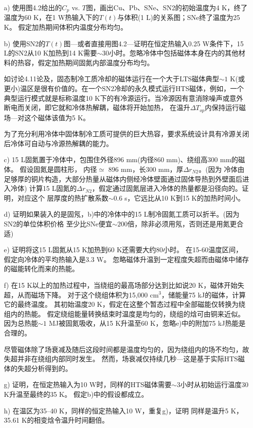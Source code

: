 a) 使用图4.2给出的$C_p$ vs. $T$图，画出Cu、Pb、SNe、SN2的初始温度为4 K，终了温度为60 K，在1 W热输入下的$T(t)$与体积(1 L)的关系图；SNe终了温度为25 K。
假定加热期间体积内温度分布均匀。

b) 使用SN2的$T(t)$图---或者直接用图4.2---证明在恒定热输入0.25 W条件下，15 L的SN2从10 K加热到14 K需要$\sim 30$小时。忽略冷体中包括磁体本身在内的其他材料的热容，假定加热期间固氮内部温度分布均匀。

如讨论4.11论及，固态制冷工质冷却的磁体运行在一个大于LTS磁体典型$\sim 1$ K(或更小)温区是很有价值的。在一个SN2冷却的永久模式运行HTS磁体，例如，一个典型运行模式就是标称温度10 K下的有冷源运行。当冷源因有意消除噪声或意外断电而关闭，即它就和冷体热解耦，磁体将开始加热，
在温升$\Delta T_{op}$内保持运行磁场---对这个磁体该值为5 K。

为了充分利用冷体中固体制冷工质可提供的巨大热容，要求系统设计具有冷源关闭后冷体可自动与冷源热解耦的能力。

c) 15 L固氮置于冷体中，包围住外径896 mm(内径860 mm)、绕组高300 mm的磁体。
假设固氮是圆柱形， 内径$\simeq$ 896 mm，长300 mm，厚$\Delta r_{N2}$。(因为
冷体由足够厚的铜片构造，大部分热量从磁体内侧经冷体壁面通过固体导热到外壁面后进入冷体) 计算15 L固氮的$\Delta r_{N2}$，假定通过固氮层进入冷体的热量都是沿径向的。证明，对应这个
层厚度的热扩散系数$\sim 0.6$ s，它远比从10 K到15 K的加热时间小。

d) 证明如果装入的是固氖，b)中的冷体中的15 L制冷固氮工质可以折半。(因为SN2的单位体积价格
至少比SNe便宜$\sim 200$倍，除非必须用氖，否则还是用氮更合适)


e) 证明将这15 L固氮从15 K加热到60 K还需要大约80小时。
在15-60温度区间，假定向冷体的平均热输入是3.3 W。
忽略磁体升温到一定程度失超而由磁体中储存的磁能转化而来的热能。

f) 在15 K以上的加热过程中，当绕组的最高场部分达到比如说20 K，磁体开始失超，从而磁场下降。
对于这个绕组体积为15,000 $\mathrm{cm^3}$，储能量75 kJ的磁体，计算它的最终温度。
其初始温度20 K，假定在这整个暂态过程中全部磁能仅转换为绕组内的热能。
假定绕组能量转换结束时温度是均匀的，绕组的焓可由铜来近似。
因为总热能$\sim 1$ MJ被固氮吸收，从15 K升温至60 K，忽略e)中的附加75 kJ热能是合理的。

尽管磁体除了场衰减及随后这段时间都是温度均匀的，因为绕组内的场不均匀，故失超并非在绕组内部同时发生。
然而，场衰减仅持续几秒---这是基于实际HTS磁体的失超分析得到的。

g) 证明，在恒定热输入为10 W时，同样的HTS磁体需要$\sim 3$小时从初始运行温度30 K升温至最终的35 K。
假定b)中的假设都成立。

h) 在温区为35–40 K，同样的恒定热输入10 W，重复g)，证明
同样是温升5 K，35.61 K的相变焓令温升时间翻倍。

